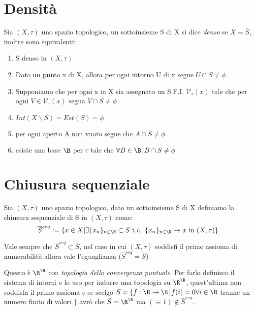 \documentclass[a4paper]{article}
\begin{document}
\section{Densità}

\begin{deff}
Sia $(X, \tau )$ uno spazio topologico, un sottoinsieme S di X si dice \emph{denso} se $X = \bar{S} $, inoltre sono equivalenti:
\begin{enumerate}
	\item S denso in $(X,\tau )$
	\item Dato un punto x di X, allora per ogni intorno U di x segue $U \cap S \neq \phi $
	\item Supponiamo che per ogni x in X sia assegnato un S.F.I. $\mathcal{V}_\tau (x) $ tale che per ogni $V \in \mathcal{V}_\tau (x)$ segua $V \cap S \neq \phi$ 
	\item $Int(X \backslash S ) = Est(S) = \phi $
	\item per ogni aperto A non vuoto segue che $A \cap S \neq \phi $
	\item esiste una base $\B$ per $\tau$ tale che $\forall B \in \B . \, B \cap S \neq \phi$
\end{enumerate}
\end{deff}

\section{Chiusura sequenziale}

\begin{deff} 
Sia $(X, \tau )$ uno spazio topologico, dato un sottoinsieme S di X definiamo la chiusura sequenziale di S in $(X,\tau)$ come:
\begin{equation*}
	\overline{S} ^{seq} := \{ x \in X | \exists \{x_n\} _{n\in \N } \subset S \text{ t.c. } \{x_n\} _{n\in \N } \to x \text{ in }(X,\tau) \}
\end{equation*}
\end{deff}

\begin{prop} 
Vale sempre che $ \overline{S} ^{seq} \subset \overline{S} $, nel caso in cui $(X,\tau)$ soddisfi il primo assioma di numerabilità allora vale l'eguaglianza ($ \overline{S} ^{seq} = \overline{S} $)
\end{prop}

\begin{ex}
Questo è $\R ^\R $ con  \emph{topologia della convergenza puntuale}. Per farlo definisco il sistema di intorni
e lo uso per indurre una topologia su $\R ^\R $, quest'ultima non soddisfa il primo assioma e se scelgo $S = \{ f:\R \to \R |\, f(i) = 0 \forall i \in \R $ tranne un numero finito di valori $\}$ avrò che $\bar{S} = \R ^\R$ ma $ (\equiv 1 ) \not \in \bar{S}^{seq}$.
\end{ex}
\end{document}

